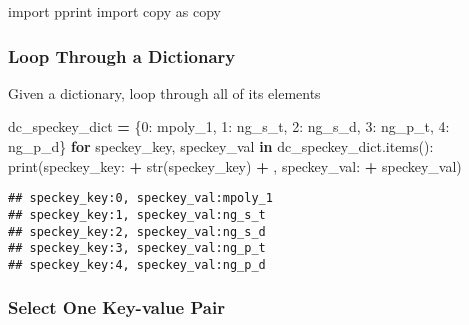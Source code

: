 \documentclass[
]{book}
\newenvironment{Shaded}{\begin{snugshade}}{\end{snugshade}}
\newcommand{\BuiltInTok}[1]{#1}
\newcommand{\ControlFlowTok}[1]{\textcolor[rgb]{0.13,0.29,0.53}{\textbf{#1}}}
\newcommand{\DecValTok}[1]{\textcolor[rgb]{0.00,0.00,0.81}{#1}}
\newcommand{\ImportTok}[1]{#1}
\newcommand{\KeywordTok}[1]{\textcolor[rgb]{0.13,0.29,0.53}{\textbf{#1}}}
\newcommand{\NormalTok}[1]{#1}
\newcommand{\OperatorTok}[1]{\textcolor[rgb]{0.81,0.36,0.00}{\textbf{#1}}}
\newcommand{\StringTok}[1]{\textcolor[rgb]{0.31,0.60,0.02}{#1}}
\begin{document}
\begin{Shaded}
\begin{Highlighting}[]
\ImportTok{import}\NormalTok{ pprint}
\ImportTok{import}\NormalTok{ copy }\ImportTok{as}\NormalTok{ copy}
\end{Highlighting}
\end{Shaded}

\hypertarget{loop-through-a-dictionary}{%
\subsubsection{Loop Through a Dictionary}\label{loop-through-a-dictionary}}

Given a dictionary, loop through all of its elements

\begin{Shaded}
\begin{Highlighting}[]
\NormalTok{dc\_speckey\_dict }\OperatorTok{=}\NormalTok{ \{}\DecValTok{0}\NormalTok{: }\StringTok{\textquotesingle{}mpoly\_1\textquotesingle{}}\NormalTok{,}
                   \DecValTok{1}\NormalTok{: }\StringTok{\textquotesingle{}ng\_s\_t\textquotesingle{}}\NormalTok{,}
                   \DecValTok{2}\NormalTok{: }\StringTok{\textquotesingle{}ng\_s\_d\textquotesingle{}}\NormalTok{,}
                   \DecValTok{3}\NormalTok{: }\StringTok{\textquotesingle{}ng\_p\_t\textquotesingle{}}\NormalTok{,}
                   \DecValTok{4}\NormalTok{: }\StringTok{\textquotesingle{}ng\_p\_d\textquotesingle{}}\NormalTok{\}}
\ControlFlowTok{for}\NormalTok{ speckey\_key, speckey\_val }\KeywordTok{in}\NormalTok{ dc\_speckey\_dict.items():}
    \BuiltInTok{print}\NormalTok{(}\StringTok{\textquotesingle{}speckey\_key:\textquotesingle{}} \OperatorTok{+} \BuiltInTok{str}\NormalTok{(speckey\_key) }\OperatorTok{+} \StringTok{\textquotesingle{}, speckey\_val:\textquotesingle{}} \OperatorTok{+}\NormalTok{ speckey\_val)}
\end{Highlighting}
\end{Shaded}

\begin{verbatim}
## speckey_key:0, speckey_val:mpoly_1
## speckey_key:1, speckey_val:ng_s_t
## speckey_key:2, speckey_val:ng_s_d
## speckey_key:3, speckey_val:ng_p_t
## speckey_key:4, speckey_val:ng_p_d
\end{verbatim}

\hypertarget{select-one-key-value-pair}{%
\subsubsection{Select One Key-value Pair}\label{select-one-key-value-pair}}
\end{document}
